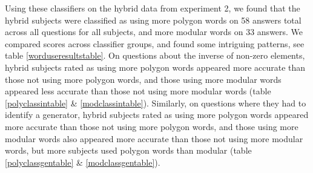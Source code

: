 \documentclass[man,10pt]{apa6}
\begin{document}
Using these classifiers on the hybrid data from experiment 2, we found that the hybrid subjects were classified as using more polygon words on 58 answers total across all questions for all subjects, and more modular words on 33 answers. We compared scores across classifier groups, and found some intriguing patterns, see table \ref{worduseresultstable}. On questions about the inverse of non-zero elements, hybrid subjects rated as using more polygon words appeared more accurate than those not using more polygon words, and those using more modular words appeared less accurate than those not using more modular words (table \ref{polyclassintable} \& \ref{modclassintable}). Similarly, on questions where they had to identify a generator, hybrid subjects rated as using more polygon words appeared more accurate than those not using more polygon words, and those using more modular words also appeared more accurate than those not using more modular words, but more subjects used polygon words than modular (table \ref{polyclassgentable} \& \ref{modclassgentable}). \par
\end{document}
